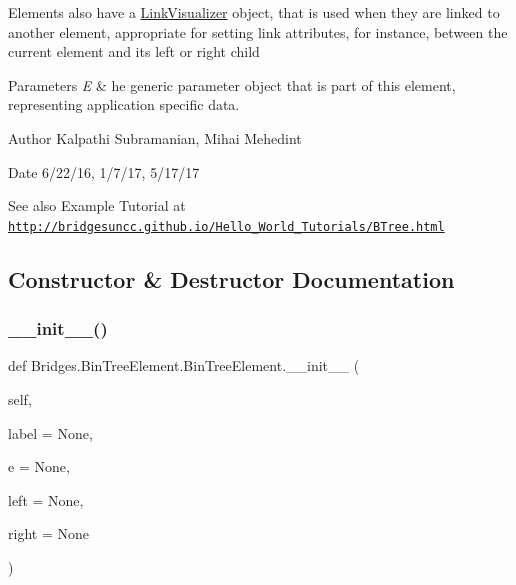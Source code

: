 Elements also have a \mbox{\hyperlink{namespace_bridges_1_1_link_visualizer}{Link\+Visualizer}} object, that is used when they are linked to another element, appropriate for setting link attributes, for instance, between the current element and its left or right child


\begin{DoxyParams}{Parameters}
{\em E} & he generic parameter object that is part of this element, representing application specific data.\\
\hline
\end{DoxyParams}
\begin{DoxyAuthor}{Author}
Kalpathi Subramanian, Mihai Mehedint
\end{DoxyAuthor}
\begin{DoxyDate}{Date}
6/22/16, 1/7/17, 5/17/17
\end{DoxyDate}
\begin{DoxySeeAlso}{See also}
Example Tutorial at ~\newline
 \href{http://bridgesuncc.github.io/Hello_World_Tutorials/BTree.html}{\tt http\+://bridgesuncc.\+github.\+io/\+Hello\+\_\+\+World\+\_\+\+Tutorials/\+B\+Tree.\+html} 
\end{DoxySeeAlso}


\subsection{Constructor \& Destructor Documentation}
\mbox{\label{class_bridges_1_1_bin_tree_element_1_1_bin_tree_element_a84d42e67dfa4b7fbae53ae797a10c13e}} 
\subsubsection{\texorpdfstring{\+\_\+\+\_\+init\+\_\+\+\_\+()}{\_\_init\_\_()}}
{\footnotesize\ttfamily def Bridges.\+Bin\+Tree\+Element.\+Bin\+Tree\+Element.\+\_\+\+\_\+init\+\_\+\+\_\+ (\begin{DoxyParamCaption}\item[{}]{self,  }\item[{}]{label = {\ttfamily None},  }\item[{}]{e = {\ttfamily None},  }\item[{}]{left = {\ttfamily None},  }\item[{}]{right = {\ttfamily None} }\end{DoxyParamCaption})}



